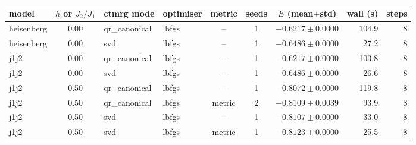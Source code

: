 \begin{tabular}{l c l l c c c r r}
\toprule
model & $h$ or $J_2/J_1$ & ctmrg mode & optimiser & metric & seeds & $E$ (mean$\pm$std) & wall (s) & steps \\
\midrule
heisenberg & 0.00 & qr\_canonical & lbfgs & -- & 1 & $-0.6217 \pm 0.0000$ & 104.9 & 8 \\
heisenberg & 0.00 & svd & lbfgs & -- & 1 & $-0.6486 \pm 0.0000$ & 27.2 & 8 \\
j1j2 & 0.00 & qr\_canonical & lbfgs & -- & 1 & $-0.6217 \pm 0.0000$ & 103.8 & 8 \\
j1j2 & 0.00 & svd & lbfgs & -- & 1 & $-0.6486 \pm 0.0000$ & 26.6 & 8 \\
j1j2 & 0.50 & qr\_canonical & lbfgs & -- & 1 & $-0.8072 \pm 0.0000$ & 119.8 & 8 \\
j1j2 & 0.50 & qr\_canonical & lbfgs & metric & 2 & $-0.8109 \pm 0.0039$ & 93.9 & 8 \\
j1j2 & 0.50 & svd & lbfgs & -- & 1 & $-0.8107 \pm 0.0000$ & 33.0 & 8 \\
j1j2 & 0.50 & svd & lbfgs & metric & 1 & $-0.8123 \pm 0.0000$ & 25.5 & 8 \\
\bottomrule
\end{tabular}
